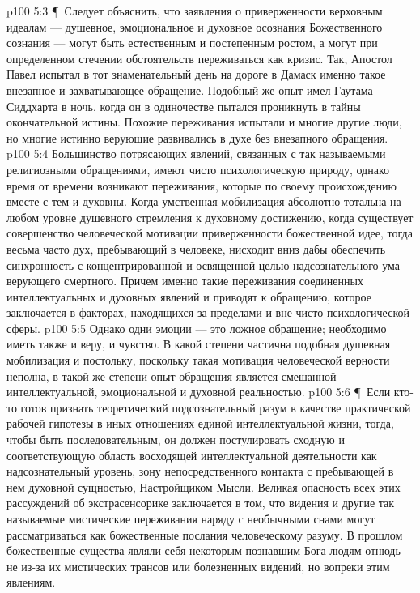 \vs p100 5:3 \P\ Следует объяснить, что заявления о приверженности верховным идеалам --- душевное, эмоциональное и духовное осознания Божественного сознания --- могут быть естественным и постепенным ростом, а могут при определенном стечении обстоятельств переживаться как кризис. Так, Апостол Павел испытал в тот знаменательный день на дороге в Дамаск именно такое внезапное и захватывающее обращение. Подобный же опыт имел Гаутама Сиддхарта в ночь, когда он в одиночестве пытался проникнуть в тайны окончательной истины. Похожие переживания испытали и многие другие люди, но многие истинно верующие развивались в духе без внезапного обращения.
\vs p100 5:4 Большинство потрясающих явлений, связанных с так называемыми религиозными обращениями, имеют чисто психологическую природу, однако время от времени возникают переживания, которые по своему происхождению вместе с тем и духовны. Когда умственная мобилизация абсолютно тотальна на любом уровне душевного стремления к духовному достижению, когда существует совершенство человеческой мотивации приверженности божественной идее, тогда весьма часто дух, пребывающий в человеке, нисходит вниз дабы обеспечить синхронность с концентрированной и освященной целью надсознательного ума верующего смертного. Причем именно такие переживания соединенных интеллектуальных и духовных явлений и приводят к обращению, которое заключается в факторах, находящихся за пределами и вне чисто психологической сферы.
\vs p100 5:5 Однако одни эмоции --- это ложное обращение; необходимо иметь также и веру, и чувство. В какой степени частична подобная душевная мобилизация и постольку, поскольку такая мотивация человеческой верности неполна, в такой же степени опыт обращения является смешанной интеллектуальной, эмоциональной и духовной реальностью.
\vs p100 5:6 \P\ Если кто\hyp{}то готов признать теоретический подсознательный разум в качестве практической рабочей гипотезы в иных отношениях единой интеллектуальной жизни, тогда, чтобы быть последовательным, он должен постулировать сходную и соответствующую область восходящей интеллектуальной деятельности как надсознательный уровень, зону непосредственного контакта с пребывающей в нем духовной сущностью, Настройщиком Мысли. Великая опасность всех этих рассуждений об экстрасенсорике заключается в том, что видения и другие так называемые мистические переживания наряду с необычными снами могут рассматриваться как божественные послания человеческому разуму. В прошлом божественные существа являли себя некоторым познавшим Бога людям отнюдь не из\hyp{}за их мистических трансов или болезненных видений, но вопреки этим явлениям.
